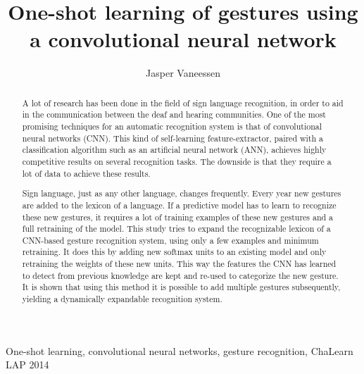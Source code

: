 \documentclass[twocolumn]{phdsymp} %
\begin{document}
\title{One-shot learning of gestures using a convolutional neural network} %

\author{Jasper Vaneessen}



\maketitle

\begin{abstract}
A lot of research has been done in the field of sign language recognition, in order to aid in the communication between the deaf and hearing communities.  One of the most promising techniques for an automatic recognition system is that of convolutional neural networks (CNN). This kind of self-learning feature-extractor, paired with a classification algorithm such as an artificial neural network (ANN), achieves highly competitive results on several recognition tasks. The downside is that they require a lot of data to achieve these results.

Sign language, just as any other language, changes frequently. Every year new gestures are added to the lexicon of a language. If a predictive model has to learn to recognize these new gestures, it requires a lot of training examples of these new gestures and a full retraining of the model. This study tries to expand the recognizable lexicon of a CNN-based gesture recognition system, using only a few examples and minimum retraining. It does this by adding new softmax units to an existing model and only retraining the weights of these new units. This way the features the CNN has learned to detect from previous knowledge are kept and re-used to categorize the new gesture. It is shown that using this method it is possible to add multiple gestures subsequently, yielding a dynamically expandable recognition system.
\end{abstract}

\begin{keywords}
One-shot learning, convolutional neural networks, gesture recognition, ChaLearn LAP 2014
\end{keywords}
\end{document}

